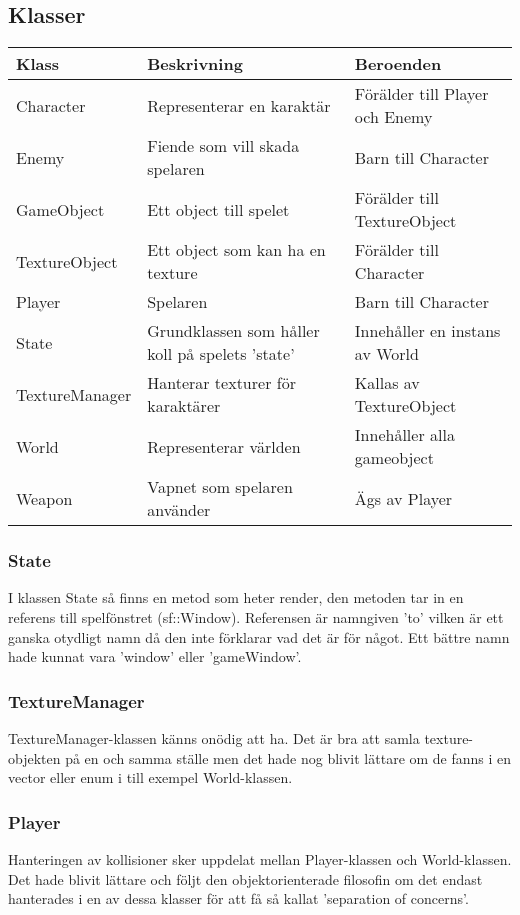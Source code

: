 \documentclass{TDP005mall}
\begin{document}
\subsection{Klasser}
\begin{table}[!h]
\begin{tabularx}{\linewidth}{|l|X|l|}
\hline
Klass & Beskrivning & Beroenden \\\hline
Character & Representerar en karaktär & Förälder till Player och Enemy \\\hline
Enemy & Fiende som vill skada spelaren & Barn till Character \\\hline
GameObject & Ett object till spelet & Förälder till TextureObject \\\hline
TextureObject & Ett object som kan ha en texture & Förälder till Character \\\hline
Player & Spelaren & Barn till Character \\\hline
State & Grundklassen som håller koll på spelets 'state' & Innehåller en instans av World \\\hline
TextureManager & Hanterar texturer för karaktärer & Kallas av TextureObject \\\hline
World & Representerar världen & Innehåller alla gameobject \\\hline
Weapon & Vapnet som spelaren använder & Ägs av Player \\\hline
\end{tabularx}
\end{table}

\subsubsection{State}
I klassen State så finns en metod som heter render, den metoden tar in en referens till spelfönstret (sf::Window). Referensen är namngiven 'to' 
vilken är ett ganska otydligt namn då den inte förklarar vad det är för något. Ett bättre namn hade kunnat vara 'window' eller 'gameWindow'.

\subsubsection{TextureManager}
TextureManager-klassen känns onödig att ha. Det är bra att samla texture-objekten på en och samma ställe men det hade nog blivit lättare om 
de fanns i en vector eller enum i till exempel World-klassen.

\subsubsection{Player}
Hanteringen av kollisioner sker uppdelat mellan Player-klassen och World-klassen. Det hade blivit lättare och följt den objektorienterade filosofin 
om det endast hanterades i en av dessa klasser för att få så kallat 'separation of concerns'. 
\end{document}
